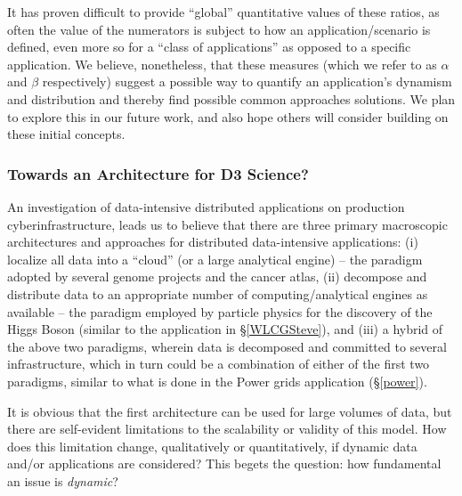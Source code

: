 
It has proven difficult to provide ``global'' quantitative values of
these ratios, as often the value of the numerators is
subject to how an application/scenario is defined, even more so for a
``class of applications'' as opposed to a specific application. We
believe, nonetheless, that these measures (which we refer to as $\alpha$ and $\beta$ respectively)
suggest a possible way to
quantify an application's dynamism and distribution and thereby find
possible common approaches solutions.  We plan to explore this in our
future work, and also hope others will consider building on these
initial concepts.


\subsubsection{Towards an Architecture for D3 Science?}


An investigation of data-intensive distributed applications on production
cyberinfrastructure, leads us to believe that there are three primary
macroscopic architectures and approaches for distributed data-intensive
applications: (i) localize all data into a ``cloud'' (or a large analytical
engine) -- the paradigm adopted by several genome projects and the cancer atlas,
(ii) decompose and distribute data to an appropriate number of
computing/analytical engines as available -- the paradigm employed by particle
physics for the discovery of the Higgs Boson (similar to the application in
\S\ref{WLCGSteve}), and (iii) a hybrid of the above two paradigms, wherein data
is decomposed and committed to several infrastructure, which in turn could be a
combination of either of the first two paradigms, similar to what is done in the
Power grids application
(\S\ref{power}). %

It is obvious that the first architecture can be used for large volumes of data,
but there are self-evident limitations to the scalability or validity of this
model. How does this limitation change, qualitatively or quantitatively, if
dynamic data and/or applications are considered? This begets the question: how
fundamental an issue is {\it dynamic}?

